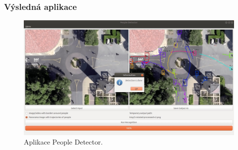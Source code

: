 \documentclass[11pt,xcolor=pdflatex]{beamer}
\begin{document}
    


\begin{frame}\frametitle{Výsledná aplikace}
    
    \begin{figure}[H]
        \centering
        \includegraphics[width=.99\linewidth]{images/gui.jpg}
        \caption{Aplikace People Detector.}
    \end{figure}
    
\end{frame}

\end{document}
